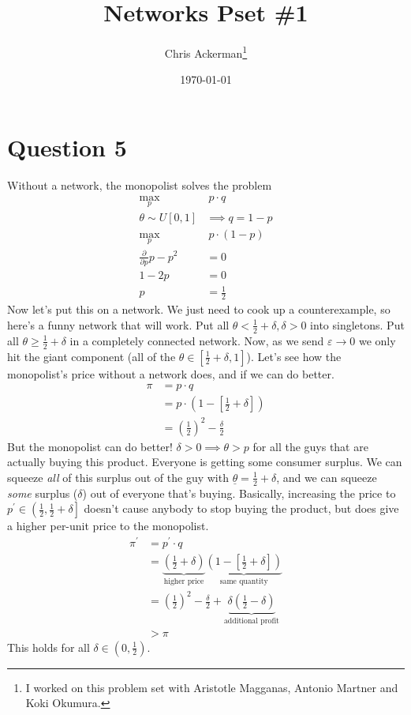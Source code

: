 
\newtheorem*{definition}{Definition}
\title{Networks Pset \#1}
\date{\today}

\author{Chris Ackerman\thanks{I worked on this problem set with Aristotle Magganas, Antonio Martner and Koki Okumura.}}

\maketitle
\section*{Question 5}
Without a network, the monopolist solves the problem
\begin{align*}
  \max_{p} &\ p \cdot q \tag{Assume $mc = 0$}\\
  \theta \sim U[0, 1] &\implies q  = 1 - p\\
  \max_p &\ p \cdot (1 - p)\\
  \frac{\partial}{\partial p} p - p^2 &= 0 \tag{FOC}\\
  1 - 2p &= 0\\
  p &= \frac{1}{2}
\end{align*}
Now let's put this on a network. We just need to cook up a counterexample, so here's a funny network that will work. Put all $\theta < \frac{1}{2} + \delta, \delta > 0$ into singletons. Put all $\theta \ge \frac{1}{2} + \delta$ in a completely connected network. Now, as we send $\varepsilon \to 0$ we only hit the giant component (all of the $\theta \in \left[\frac{1}{2} + \delta, 1\right]$). Let's see how the monopolist's price without a network does, and if we can do better.
\begin{align*}
  \pi &= p \cdot q\\
      &= p \cdot \left(1 - \left[\frac{1}{2} + \delta\right]\right)\\
  &= \left(\frac{1}{2}\right)^2 - \frac{\delta}{2}
\end{align*}
But the monopolist can do better! $\delta > 0 \implies \theta > p $ for all the guys that are actually buying this product. Everyone is getting some consumer surplus. We can squeeze \emph{all} of this surplus out of the guy with $\underline{\theta} = \frac{1}{2} + \delta$, and we can squeeze \emph{some} surplus ($\delta$) out of everyone that's buying. Basically, increasing the price to $p^\prime \in \left(\frac{1}{2}, \frac{1}{2} + \delta\right]$ doesn't cause anybody to stop buying the product, but does give a higher per-unit price to the monopolist.
\begin{align*}
  \pi^\prime &= p^\prime \cdot q\\
             &= \underbrace{\left(\frac{1}{2} + \delta\right)}_{\text{higher price}} \underbrace{\left(1 - \left[\frac{1}{2} + \delta\right]\right)}_{\text{same quantity}}\\
             &= \left(\frac{1}{2}\right)^2 - \frac{\delta}{2} + \underbrace{\delta \left(\frac{1}{2} - \delta\right)}_{\text{additional profit}}\\
  &> \pi
\end{align*}
This holds for all $\delta \in \left(0, \frac{1}{2}\right)$.

